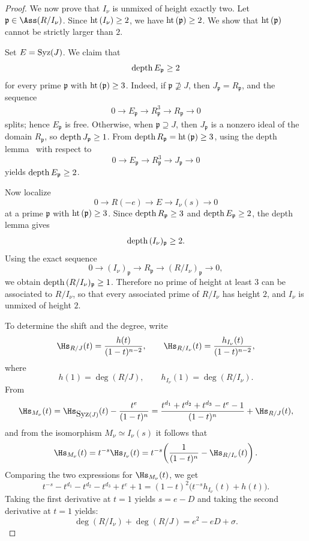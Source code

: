 \documentclass[11pt]{amsart} %
\theoremstyle{definition}
\def\hht{{\rm ht}\,}
\def\depth{{\rm depth}\,}
\def\syz{\mbox{\rm Syz}}
\def\hht{{\rm ht}\,}
\def\fp{{\mathfrak p}}
\begin{document}
\begin{proof}
We now prove that $I_{\nu}$ is unmixed of height exactly two. Let $\fp \in \Ass(R/I_\nu)$. Since
$\hht(I_\nu)\geq 2$, we have $\hht(\fp)\geq2$. We show that $\hht(\fp)$ cannot be
strictly larger than $2$.

Set $E=\syz(J)$. We claim that
\[
\depth E_\fp \geq2
\]
for every prime $\fp$ with $\hht(\fp)\geq3$. Indeed, if $\fp \not\supseteq J$, then
$J_\fp=R_\fp$, and the sequence
\begin{align*}
0\to E_\fp\to R_\fp^3\to R_\fp\to0    
\end{align*}
splits; hence $E_\fp$ is free. Otherwise, when $\fp\supseteq J$, then $J_\fp$ is a nonzero ideal
of the domain $R_\fp$, so $\depth J_\fp\geq1$. From $\depth R_\fp=\hht(\fp)\geq3$, using the depth lemma~\cite[Proposition~1.2.9]{bruns1998cohen} with respect to 
$$
0 \to E_{\fp} \to R_{\fp}^3 \to J_\fp \to 0
$$
yields $\depth E_\fp\geq2$.

Now localize
\[
0\to R(-e)\to E\to I_\nu(s)\to0
\]
at a prime $\fp$ with $\hht(\fp)\geq3$. Since $\depth R_\fp\geq3$ and
$\depth E_\fp\geq2$, the depth lemma gives
\[
\depth (I_\nu)_\fp \geq2.
\]
Using the exact sequence
\[
0\to (I_\nu)_\fp \to R_\fp \to (R/I_\nu)_\fp \to0,
\]
we obtain $\depth (R/I_\nu)_\fp \geq1$. Therefore no prime of height at least $3$ can be associated to $R/I_\nu$, so that every associated prime of $R/I_\nu$ has height $2$, and $I_\nu$ is unmixed
of height $2$.


To determine the shift and the degree, write
\[
\Hs_{R/J}(t)=\frac{h(t)}{(1-t)^{n-2}},
\qquad
\Hs_{R/I_\nu}(t)=\frac{h_{I_\nu}(t)}{(1-t)^{n-2}},
\]
where
\[
h(1)=\deg(R/J),
\qquad
h_{I_\nu}(1)=\deg(R/I_\nu).
\]
From
\[
\Hs_{M_\nu}(t)
=
\Hs_{\syz(J)}(t)-\frac{t^e}{(1-t)^n}
=
\frac{t^{d_1}+t^{d_2}+t^{d_3}-t^e-1}{(1-t)^n}
+\Hs_{R/J}(t),
\]
and from the isomorphism $M_\nu\simeq I_\nu(s)$ it follows that
\[
\Hs_{M_\nu}(t)=t^{-s}\Hs_{I_\nu}(t)
=
t^{-s}\!\left(\frac{1}{(1-t)^n}-\Hs_{R/I_\nu}(t)\right).
\]
Comparing the two expressions for $\Hs_{M_\nu}(t)$, we get
\[
t^{-s}-t^{d_1}-t^{d_2}-t^{d_3}+t^e+1
=
(1-t)^2\bigl(t^{-s}h_{I_\nu}(t)+h(t)\bigr).
\]
Taking the first derivative at $t=1$ yields $s=e-D$ and taking the second derivative at $t=1$ yields:
\[
\deg(R/I_\nu)+\deg(R/J)
=e^2-eD+\sigma.
\]

\smallskip

\noindent


\end{proof}
\end{document}

